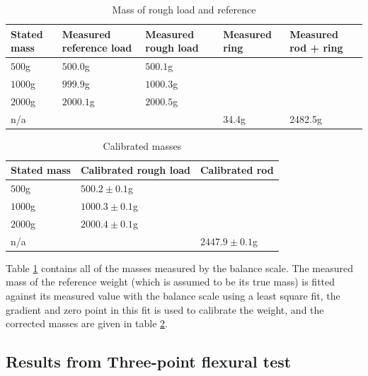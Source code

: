 \documentclass[11pt,a4paper]{article}
\begin{document}
    \begin{table}[H]
      \center
      \caption{Mass of rough load and reference}
      \begin{tabular}{ | l | l | l | l | l |}
        \hline
        Stated mass   & Measured reference load   & Measured rough load & Measured ring & Measured rod + ring \\ \hline
        $500$g        & $500.0$g             & $500.1$g &   &  \\ \hline
        $1000$g       & $999.9$g             & $1000.3$g &  &  \\ \hline
        $2000$g       & $2000.1$g            & $2000.5$g &  &  \\ \hline
        n/a           &  &  & 34.4g & 2482.5g
        \\ \hline
      \end{tabular}
      \label{tab:masses}
    \end{table}

    \begin{table}[H]
      \center
      \caption{Calibrated masses}
      \begin{tabular}{ | l | l | l |}
        \hline
        Stated mass & Calibrated rough load & Calibrated rod \\ \hline
        $500$g  & $500.2\pm 0.1$g  &  \\ \hline
        $1000$g &$1000.3\pm 0.1$g  &  \\ \hline
        $2000$g &$2000.4\pm 0.1$g  &  \\ \hline
        n/a     &            & $2447.9\pm 0.1$g
        \\ \hline
      \end{tabular}
      \label{tab:masses_calibrated}
    \end{table}

    Table \ref{tab:masses} contains all of the masses measured by the balance scale. The measured mass of the reference weight (which is assumed to be its true mass) is fitted against its measured value with the balance scale using a least square fit, the gradient and zero point in this fit is used to calibrate the weight, and the corrected masses are given in table \ref{tab:masses_calibrated}.





  \subsection{Results from Three-point flexural test}
\end{document}

